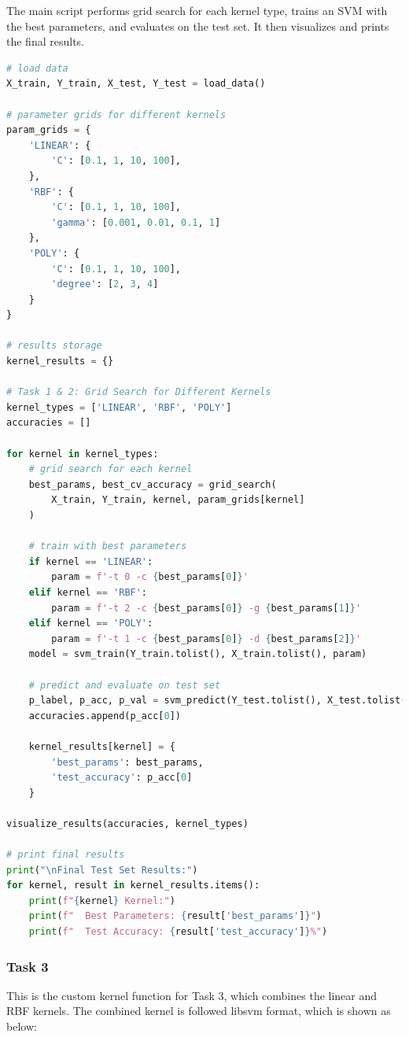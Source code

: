 \documentclass{homework}
\begin{document}
The main script performs grid search for each kernel type, trains an SVM with the best parameters, and evaluates on the test set. It then visualizes and prints the final results.

\begin{lstlisting}[language=Python]
# load data
X_train, Y_train, X_test, Y_test = load_data()

# parameter grids for different kernels
param_grids = {
    'LINEAR': {
        'C': [0.1, 1, 10, 100],
    },
    'RBF': {
        'C': [0.1, 1, 10, 100],
        'gamma': [0.001, 0.01, 0.1, 1]
    },
    'POLY': {
        'C': [0.1, 1, 10, 100],
        'degree': [2, 3, 4]
    }
}

# results storage
kernel_results = {}

# Task 1 & 2: Grid Search for Different Kernels
kernel_types = ['LINEAR', 'RBF', 'POLY']
accuracies = []

for kernel in kernel_types:
    # grid search for each kernel
    best_params, best_cv_accuracy = grid_search(
        X_train, Y_train, kernel, param_grids[kernel]
    )
    
    # train with best parameters
    if kernel == 'LINEAR':
        param = f'-t 0 -c {best_params[0]}'
    elif kernel == 'RBF':
        param = f'-t 2 -c {best_params[0]} -g {best_params[1]}'
    elif kernel == 'POLY':
        param = f'-t 1 -c {best_params[0]} -d {best_params[2]}'
    model = svm_train(Y_train.tolist(), X_train.tolist(), param)
    
    # predict and evaluate on test set
    p_label, p_acc, p_val = svm_predict(Y_test.tolist(), X_test.tolist(), model)
    accuracies.append(p_acc[0])
    
    kernel_results[kernel] = {
        'best_params': best_params,
        'test_accuracy': p_acc[0]
    }

visualize_results(accuracies, kernel_types)

# print final results
print("\nFinal Test Set Results:")
for kernel, result in kernel_results.items():
    print(f"{kernel} Kernel:")
    print(f"  Best Parameters: {result['best_params']}")
    print(f"  Test Accuracy: {result['test_accuracy']}%")
\end{lstlisting}

\subsubsection{Task 3}

This is the custom kernel function for Task 3, which combines the linear and RBF kernels. The combined kernel is followed libsvm format, which is shown as below:
\end{document}
